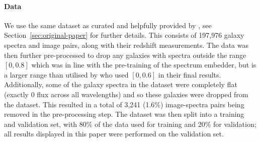 \paragraph{Data} We use the same dataset as curated and helpfully provided by \cite{astroclip}, see Section~\eqref{sec:original-paper}
for further details.
This consists of 197,976 galaxy spectra and image pairs, along with their redshift measurements.
The data was then further pre-processed to drop any galaxies with spectra outside the range $[0, 0.8]$ which was in line with the
pre-training of the spectrum embedder, but is a larger range than utilised by \cite{astroclip} who used $[0, 0.6]$ in their final results.
Additionally, some of the galaxy spectra in the dataset were completely flat (exactly 0 flux across all wavelengths)
and so these galaxies were dropped from the dataset.
This resulted in a total of 3,241 (1.6\%) image-spectra pairs being removed in the pre-processing step.
The dataset was then split into a training and validation set, with 80\% of the data used for training and 20\% for
validation; all results displayed in this paper were performed on the validation set.
